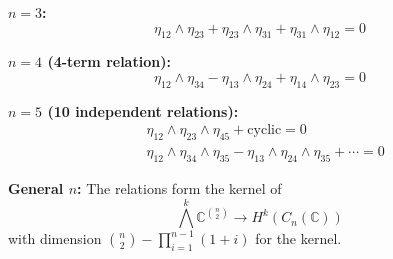 \textbf{$n = 3$:}
\[
\eta_{12} \wedge \eta_{23} + \eta_{23} \wedge \eta_{31} + \eta_{31} \wedge \eta_{12} = 0
\]
 
\textbf{$n = 4$ (4-term relation):}
\[
\eta_{12} \wedge \eta_{34} - \eta_{13} \wedge \eta_{24} + \eta_{14} \wedge \eta_{23} = 0
\]
 
\textbf{$n = 5$ (10 independent relations):}
\begin{align}
&\eta_{12} \wedge \eta_{23} \wedge \eta_{45} + \text{cyclic} = 0 \\
&\eta_{12} \wedge \eta_{34} \wedge \eta_{35} - \eta_{13} \wedge \eta_{24} \wedge \eta_{35} + \cdots = 0
\end{align}
 
\textbf{General $n$:} The relations form the kernel of
\[
\bigwedge^k \mathbb{C}^{\binom{n}{2}} \to H^k(C_n(\mathbb{C}))
\]
with dimension $\binom{n}{2} - \prod_{i=1}^{n-1}(1 + i)$ for the kernel. 
